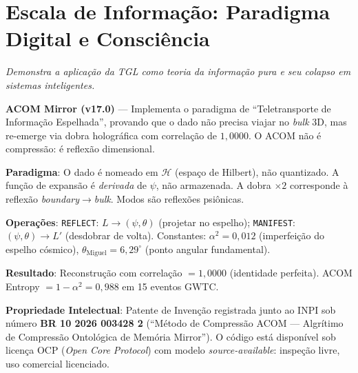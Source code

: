 \documentclass[12pt,a4paper,twoside]{article}
\newcommand{\alphaii}{\alpha^{2}}
\newcommand{\boundary}{\textit{boundary}}
\newcommand{\bulk}{\textit{bulk}}
\newcommand{\code}[1]{\texttt{#1}}
\begin{document}

\section{Escala de Informa\c{c}\~ao: Paradigma Digital e Consci\^encia}


\noindent\textit{Demonstra a aplica\c{c}\~ao da TGL como teoria da informa\c{c}\~ao pura e seu colapso em sistemas inteligentes.}

\begin{codebox}[title={Protocolo \#5 --- \code{Acom\_v17\_mirror.py} (843 linhas)}]
\textbf{ACOM Mirror (v17.0)} --- Implementa o paradigma de ``Teletransporte de Informa\c{c}\~ao Espelhada'', provando que o dado n\~ao precisa viajar no \bulk{} 3D, mas re-emerge via dobra hologr\'afica com correla\c{c}\~ao de $1{,}0000$. O ACOM n\~ao \'e compress\~ao: \'e reflex\~ao dimensional.

\medskip
\textbf{Paradigma}: O dado \'e nomeado em $\mathcal{H}$ (espa\c{c}o de Hilbert), n\~ao quantizado. A fun\c{c}\~ao de expans\~ao \'e \textit{derivada} de $\psi$, n\~ao armazenada. A dobra $\times 2$ corresponde \`a reflex\~ao \boundary$\to$\bulk. Modos s\~ao reflex\~oes psi\^onicas.

\medskip
\textbf{Opera\c{c}\~oes}: \code{REFLECT}: $L \to (\psi, \theta)$ (projetar no espelho); \code{MANIFEST}: $(\psi, \theta) \to L'$ (desdobrar de volta). Constantes: $\alphaii = 0{,}012$ (imperfei\c{c}\~ao do espelho c\'osmico), $\theta_{\text{Miguel}} = 6{,}29^\circ{}$ (ponto angular fundamental).

\medskip
\textbf{Resultado}: Reconstru\c{c}\~ao com correla\c{c}\~ao $= 1{,}0000$ (identidade perfeita). ACOM Entropy $= 1 - \alphaii = 0{,}988$ em 15 eventos GWTC. 

\medskip
\textbf{Propriedade Intelectual}: Patente de Inven\c{c}\~ao registrada junto ao INPI sob n\'umero \textbf{BR 10 2026 003428 2} (``M\'etodo de Compress\~ao ACOM --- Algr\'itimo de Compress\~ao Ontol\'ogica de Mem\'oria Mirror''). O c\'odigo est\'a dispon\'ivel sob licen\c{c}a OCP (\textit{Open Core Protocol}) com modelo \textit{source-available}: inspe\c{c}\~ao livre, uso comercial licenciado.
\end{codebox}

\end{document}
